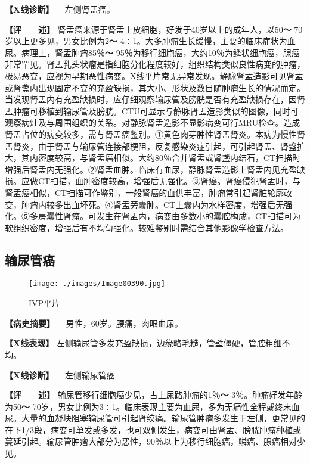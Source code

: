 \textbf{【X线诊断】} 　左侧肾盂癌。

\textbf{【评　　述】}
肾盂癌来源于肾盂上皮细胞，好发于40岁以上的成年人，以50\textbf{～}
70岁以上更多见，男女比例为2\textbf{～}
4∶1。大多肿瘤生长缓慢，主要的临床症状为血尿。病理上，肾盂肿瘤85％\textbf{～}
95％为移行细胞癌，大约10％为鳞状细胞癌，腺癌非常罕见。肾盂乳头状瘤是指细胞分化程度较好，组织结构类似良性病变的肿瘤，极易恶变，应视为早期恶性病变。X线平片常无异常发现。静脉肾盂造影可见肾盂或肾盏内出现固定不变的充盈缺损，其大小、形状及数目随肿瘤生长的情况而定。当发现肾盂内有充盈缺损时，应仔细观察输尿管及膀胱是否有充盈缺损存在，因肾盂肿瘤可移植到输尿管及膀胱。CTU可显示与静脉肾盂造影类似的图像，同时可观察病灶及与周围组织的关系。对静脉肾盂造影不显影病变可行MRU检查。造成肾盂占位的病变较多，需与肾盂癌鉴别。①黄色肉芽肿性肾盂肾炎。本病为慢性肾盂肾炎，由于肾盂与输尿管连接部梗阻，反复感染炎症引起，可引起肾盂、肾盏扩大，其内密度较高，与肾盂癌相似。大约80％合并肾盂或肾盏内结石，CT扫描时增强后肾盂内无强化。②肾盂血肿。临床有血尿，静脉肾盂造影上肾盂内见充盈缺损。应做CT扫描，血肿密度较高，增强后无强化。③肾癌。肾癌侵犯肾盂时，与肾盂癌相似，CT扫描可作鉴别，一般肾癌的血供丰富，肿瘤常引起肾脏轮廓改变，肿瘤内较多出血坏死。④肾盂旁囊肿。CT上囊内为水样密度，增强后无强化。⑤多房囊性肾瘤。可发生在肾盂内，病变由多数小的囊腔构成，CT扫描可为软组织密度，增强后有不均匀强化。较难鉴别时需结合其他影像学检查方法。

\subsection{输尿管癌}

\begin{figure}[!htbp]
    \centering
    \texttt{[image: ./images/Image00390.jpg]}
    \captionsetup{justification=centering}
    \caption{IVP平片}
    \label{fig6-5-4}
\end{figure}

\textbf{【病史摘要】} 　男性，60岁。腰痛，肉眼血尿。

\textbf{【X线表现】}
左侧输尿管多发充盈缺损，边缘略毛糙，管壁僵硬，管腔粗细不均。

\textbf{【X线诊断】} 　左侧输尿管癌

\textbf{【评　　述】}
输尿管移行细胞癌少见，占上尿路肿瘤的1％\textbf{～}
3％。肿瘤好发年龄为50\textbf{～}
70岁，男女比例为3∶1。临床表现主要为血尿，多为无痛性全程或终末血尿。大量的血凝块阻塞输尿管可引起肾绞痛。输尿管肿瘤多发生于左侧，更常见的在下1/3段，病变可单发或多发，也可双侧发生，病变可由肾盂、膀胱肿瘤种植或蔓延引起。输尿管肿瘤大部分为恶性，90％以上为移行细胞癌，鳞癌、腺癌相对少见。


